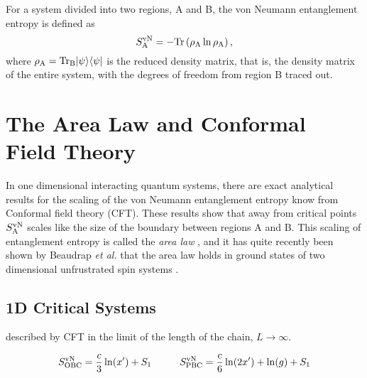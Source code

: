 For a system divided into two regions, A and B, the von Neumann entanglement entropy is defined as
\begin{equation}
	S^{\text{vN}}_\text{A} = -\rm{Tr}\left({\rho_A \ln \rho_A}\right),
\end{equation}
where $\rho_{\rm{A}}=\rm{Tr}_B\lvert {\psi} \rangle\langle {\psi} \rvert$ is the reduced density matrix, that is, the density matrix of the entire system, with the degrees of freedom from region B traced out.
\section{The Area Law and Conformal Field Theory}
In one dimensional interacting quantum systems, there are exact analytical results for the scaling of the von Neumann entanglement entropy know from Conformal field theory (CFT).
These results show that away from critical points $S^{\text{vN}}_\text{A}$ scales like the size of the boundary between regions A and B.  This scaling of entanglement entropy is called the {\it area law} \cite{Shredder}, and it has quite recently been shown by Beaudrap {\it et al.} that the area law holds in ground states of two dimensional unfrustrated spin systems \cite{DeBeaudrap2010}.




\subsection{1D Critical Systems}

\cite{Cardy} \cite{Zhou2006}

described by CFT in the limit of the length of the chain, $L \rightarrow \infty$.

\begin{equation}
	S^{\text{vN}}_{\text{OBC}} = \frac{c}{3}\ln(x') + S_1
	\hspace{1cm}
	S^{\text{vN}}_{\text{PBC}} = \frac{c}{6}\ln(2x') + \ln(g)+ S_1
\end{equation}




